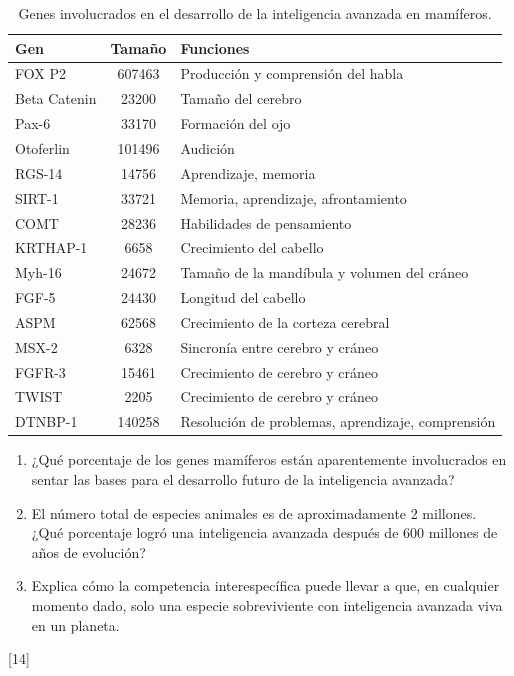 \documentclass[a4paper]{article}
\newcounter{problema}
\begin{document}
\begin{problema}
\begin{table}[H]
\centering
\begin{tabular}{|l|c|l|}
\hline
\textbf{Gen} & \textbf{Tamaño} & \textbf{Funciones} \\
\hline
FOX P2       & 607463         & Producción y comprensión del habla \\
\hline
Beta Catenin & 23200          & Tamaño del cerebro \\
\hline
Pax-6        & 33170          & Formación del ojo \\
\hline
Otoferlin    & 101496         & Audición \\
\hline
RGS-14       & 14756          & Aprendizaje, memoria \\
\hline
SIRT-1       & 33721          & Memoria, aprendizaje, afrontamiento \\
\hline
COMT        & 28236          & Habilidades de pensamiento \\
\hline
KRTHAP-1     & 6658           & Crecimiento del cabello \\
\hline
Myh-16       & 24672          & Tamaño de la mandíbula y volumen del cráneo \\
\hline
FGF-5        & 24430          & Longitud del cabello \\
\hline
ASPM         & 62568          & Crecimiento de la corteza cerebral \\
\hline
MSX-2        & 6328           & Sincronía entre cerebro y cráneo \\
\hline
FGFR-3       & 15461          & Crecimiento de cerebro y cráneo \\
\hline
TWIST        & 2205           & Crecimiento de cerebro y cráneo \\
\hline
DTNBP-1      & 140258         & Resolución de problemas, aprendizaje, comprensión \\
\hline
\end{tabular}
\caption{Genes involucrados en el desarrollo de la inteligencia avanzada en mamíferos.}
\label{tab:genes_inteligencia}
\end{table}

\begin{enumerate}
	\item ¿Qué porcentaje de los genes mamíferos están aparentemente involucrados en sentar las bases para el desarrollo futuro de la inteligencia avanzada?

	\item El número total de especies animales es de aproximadamente 2 millones. ¿Qué porcentaje logró una inteligencia avanzada después de 600 millones de años de evolución?

	\item Explica cómo la competencia interespecífica puede llevar a que, en cualquier momento dado, solo una especie sobreviviente con inteligencia avanzada viva en un planeta.
\end{enumerate}

\end{problema}
[14] \cite{NASA_AstrobiologyMath}
\end{document}
